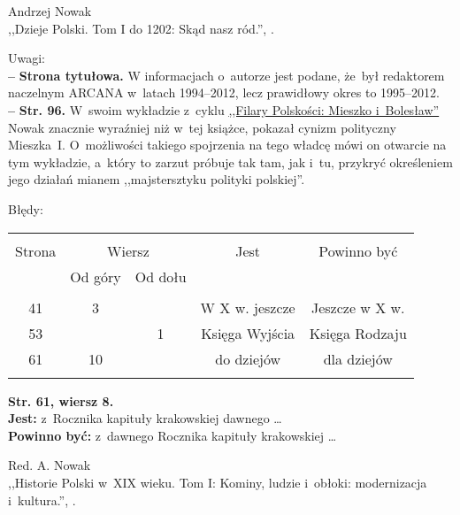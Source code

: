 \documentclass[a4paper,11pt]{article}
\newcommand{\tb}{\textbf}
\newcommand{\Str}[1]{\textbf{Str. #1.}}
\newcommand{\StrWg}[2]{\textbf{Str. #1, wiersz #2.}}
\newcommand{\noi}{\noindent}
\newcommand{\start}{\noi \tb{--} {}}
\newcommand{\Jest}{\textbf{Jest: }}
\newcommand{\Pow}{\textbf{Powinno być: }}
\newcommand{\Work}[1]{ \begin{center} {\large #1} \end{center} }
\begin{document}
\Work{
  Andrzej Nowak \\
  ,,Dzieje Polski. Tom I do 1202: Skąd nasz ród.'', \cite{Now14a}. }

Uwagi: \\
\start \tb{Strona tytułowa.} W informacjach o~autorze jest podane,
że~był redaktorem naczelnym ARCANA w~latach 1994--2012, lecz
prawidłowy okres to 1995--2012. \\
\start \Str{96} W~swoim wykładzie z~cyklu \href{https://www.youtube.com/watch?v=QovVLT2fitc}{,,Filary Polskości: Mieszko i~Bolesław''} Nowak znacznie wyraźniej niż w~tej książce, pokazał cynizm polityczny Mieszka~I. O~możliwości takiego spojrzenia na tego władcę mówi on otwarcie na tym wykładzie, a~który to zarzut próbuje tak tam, jak i~tu, przykryć określeniem jego działań mianem ,,majstersztyku polityki polskiej''.

Błędy:\\
\begin{center}
  \begin{tabular}{|c|c|c|c|c|}
    \hline
    & \multicolumn{2}{c|}{} & & \\
    Strona & \multicolumn{2}{c|}{Wiersz}& Jest & Powinno być \\ \cline{2-3}
    & Od góry & Od dołu &  &  \\ \hline
    & & & & \\
    41 & 3 & & W X w. jeszcze & Jeszcze w X w. \\
    53 & & 1 & Księga Wyjścia & Księga Rodzaju \\
    61 & 10 & & do dziejów & dla dziejów \\
    & & & & \\ \hline
  \end{tabular}
\end{center}
\StrWg{61}{8} \\
\Jest z~Rocznika kapituły krakowskiej dawnego \ldots \\
\Pow z~dawnego Rocznika kapituły krakowskiej \ldots \\


\begin{center}
  Red. A. Nowak \\
  ,,Historie Polski w~XIX wieku. Tom I: Kominy, ludzie i~obłoki:
  modernizacja i~kultura.'', \cite{HPXIX1}.
\end{center}
\end{document}
